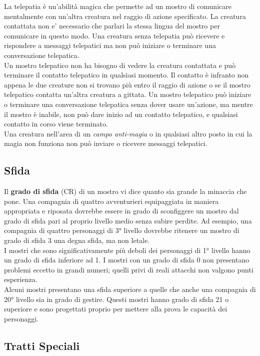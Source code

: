 La telepatia è un'abilità magica che permette ad un mostro di comunicare mentalmente con un'altra creatura nel raggio di azione specificato. La creatura contattata non e' necessario che parlari la stessa lingua del mostro per comunicare in questo modo. Una creatura senza telepatia può ricevere e rispondere a messaggi telepatici ma non può iniziare o terminare una conversazione telepatica.\\
Un mostro telepatico non ha bisogno di vedere la creatura contattata e può terminare il contatto telepatico in qualsiasi momento. Il contatto è infranto non appena le due creature non si trovano più entro il raggio di azione o se il mostro telepatico contatta un'altra creatura a gittata. Un mostro telepatico può iniziare o terminare una conversazione  telepatica senza dover usare un'azione, ma mentre il mostro è inabile, non può dare inizio ad un contatto telepatico, e qualsiasi contatto in corso viene terminato.\\
Una creatura nell'area di un \emph{campo anti-magia} o in qualsiasi altro posto in cui la magia non funziona non può inviare o ricevere messaggi telepatici.

\subsection{Sfida}

Il \textbf{grado di sfida} (CR) di un mostro vi dice quanto sia grande la minaccia che pone. Una compagnia di quattro avventurieri equipaggiata in maniera appropriata e riposata dovrebbe essere in grado di sconfiggere un mostro dal grado di sfida pari al proprio livello medio senza subire perdite. Ad esempio, una compagnia di quattro personaggi di 3° livello dovrebbe ritenere un mostro di grado di sfida 3 una degna sfida, ma non letale.\\
I mostri che sono significativamente più deboli dei personaggi di 1° livello hanno un grado di sfida inferiore ad 1. I mostri con un grado di sfida 0 non presentano problemi eccetto in grandi numeri; quelli privi di reali attacchi non valgono punti esperienza.\\
Alcuni mostri presentano una sfida superiore a quelle che anche una compagnia di 20° livello sia in grado di gestire. Questi mostri hanno grado di sfida 21 o superiore e sono progettati proprio per mettere alla prova le capacità dei personaggi.\\

\subsection{Tratti Speciali}

